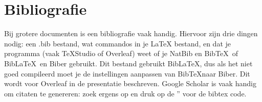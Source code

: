 \documentclass{article}
\begin{document}
\section{Bibliografie}
Bij grotere documenten is een bibliografie vaak handig. \cite{goossens1994latex} Hiervoor zijn drie dingen nodig: een .bib bestand, wat commandos in je LaTeX bestand, en dat je programma (vaak TeXStudio of Overleaf) weet of je NatBib en Bib\TeX\ of Bib\LaTeX\ en Biber gebruikt. Dit bestand gebruikt Bib\LaTeX, dus als het niet goed compileerd moet je de instellingen aanpassen van Bib\TeX naar Biber. Dit wordt voor Overleaf in de presentatie beschreven. \cite{pres} Google Scholar is vaak handig om citaten te genereren: zoek ergens op en druk op de '' voor de bibtex code.
\printbibliography
\end{document}

